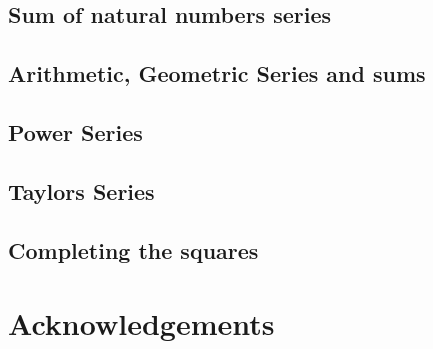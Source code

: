 \documentclass[english, 11pt]{article}
\begin{document}
\subsection{Sum of natural numbers series}
\subsection{Arithmetic, Geometric Series and sums}
\subsection{Power Series}
\subsection{Taylors Series}
\subsection{Completing the squares}
\section{Acknowledgements}

  
\end{document}

